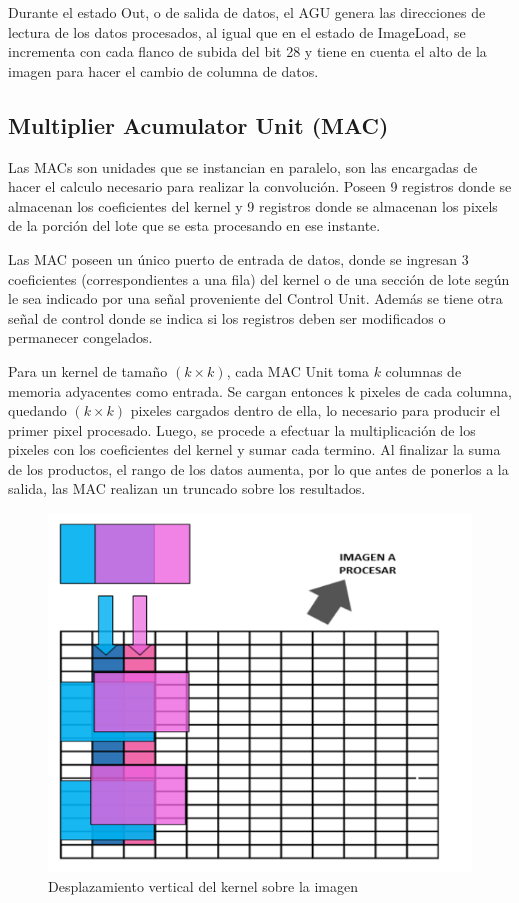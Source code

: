 Durante el estado Out, o de salida de datos, el AGU genera las direcciones de
lectura de los datos procesados, al igual que en el estado de ImageLoad, se
incrementa con cada flanco de subida del bit 28 y tiene en cuenta el alto de la
imagen para hacer el cambio de columna de datos.

\subsection{Multiplier Acumulator Unit (MAC)}\label{sec:MAC}

Las MACs son unidades que se instancian en paralelo, son las encargadas de
hacer el calculo necesario para realizar la convolución. Poseen 9 registros
donde se almacenan los coeficientes del kernel y 9 registros donde se almacenan
los pixels de la porción del lote que se esta procesando en ese instante.

Las MAC poseen un único puerto de entrada de datos, donde se ingresan 3
coeficientes (correspondientes a una fila) del kernel o de una sección de lote
según le sea indicado por una señal proveniente del Control Unit. Además se
tiene otra señal de control donde se indica si los registros deben ser
modificados o permanecer congelados.

Para un kernel de tamaño $(k \times k)$, cada MAC Unit toma $k$ columnas de memoria
adyacentes como entrada. Se cargan entonces k pixeles de cada columna, quedando
$(k \times k)$ pixeles cargados dentro de ella, lo necesario para producir el
primer pixel procesado. Luego, se procede a efectuar la multiplicación de los
pixeles con los coeficientes del kernel y sumar cada termino. Al finalizar la
suma de los productos, el rango de los datos aumenta, por lo que antes de
ponerlos a la salida, las MAC realizan un truncado sobre los resultados.

\begin{figure}
\centering
\includegraphics[scale=0.7]{conv1_despl.png}
\caption{Desplazamiento vertical del kernel sobre la imagen }
\label{verticaldesp}
\end{figure}

